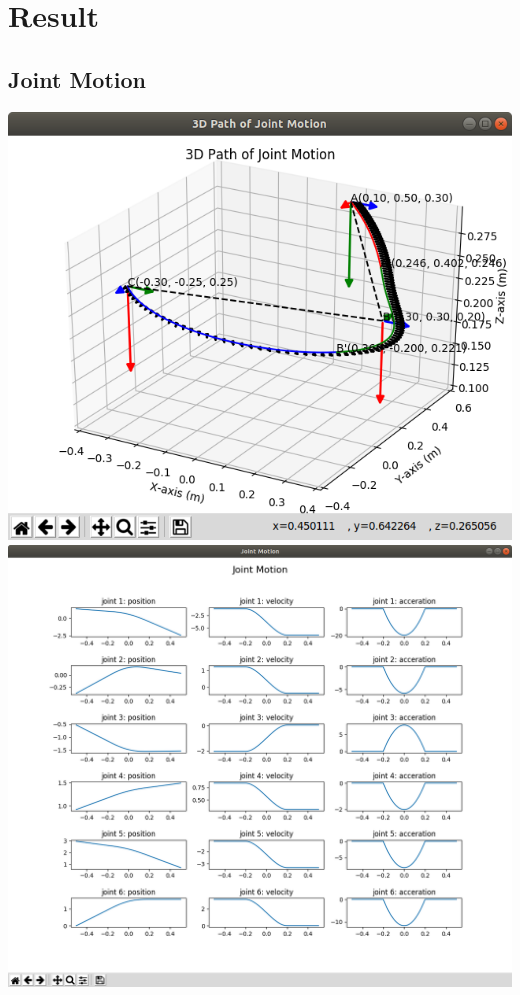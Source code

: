 \documentclass[12pt]{article}
\begin{document}
\section{Result}
\subsection{Joint Motion}
\includegraphics[scale=0.5]{joint_path}\\
\includegraphics[scale=0.3]{joint_param}
\end{document}
